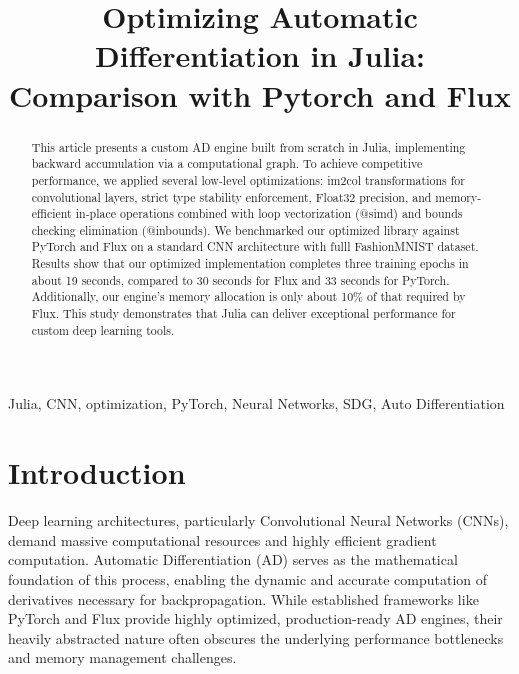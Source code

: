 \documentclass[conference]{IEEEtran}
\begin{document}
\title{Optimizing Automatic Differentiation in Julia: Comparison with Pytorch and Flux}

\author{
\and
{}
}

\maketitle

\begin{abstract}
This article presents a custom AD engine built from scratch in Julia, implementing backward accumulation via a computational graph. To achieve competitive performance, we applied several low-level optimizations: im2col transformations for convolutional layers, strict type stability enforcement, Float32 precision, and memory-efficient in-place operations combined with loop vectorization (@simd) and bounds checking elimination (@inbounds). We benchmarked our optimized library against PyTorch and Flux on a standard CNN architecture with fulll FashionMNIST dataset. Results show that our optimized implementation completes three training epochs in about 19 seconds, compared to 30 seconds for Flux and 33 seconds for PyTorch. Additionally, our engine's memory allocation is only about 10\% of that required by Flux. This study demonstrates that Julia can deliver exceptional performance for custom deep learning tools.
\end{abstract}

\begin{IEEEkeywords}
Julia, CNN, optimization, PyTorch, Neural Networks, SDG, Auto Differentiation
\end{IEEEkeywords}

\section{Introduction}
Deep learning architectures, particularly Convolutional Neural Networks (CNNs), demand massive computational resources and highly efficient gradient computation. Automatic Differentiation (AD) serves as the mathematical foundation of this process, enabling the dynamic and accurate computation of derivatives necessary for backpropagation. While established frameworks like PyTorch and Flux provide highly optimized, production-ready AD engines, their heavily abstracted nature often obscures the underlying performance bottlenecks and memory management challenges.
\end{document}

